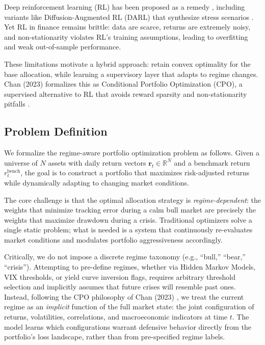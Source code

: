 \documentclass[conferences]{IEEEtran}
\begin{document}
Deep reinforcement learning (RL) has been proposed as a remedy \cite{sood2023}, including variants like Diffusion-Augmented RL (DARL) that synthesize stress scenarios \cite{choudhary2025}. Yet RL in finance remains brittle: data are scarce, returns are extremely noisy, and non-stationarity violates RL's training assumptions, leading to overfitting and weak out-of-sample performance.

These limitations motivate a hybrid approach: retain convex optimality for the base allocation, while learning a supervisory layer that adapts to regime changes. Chan (2023) formalizes this as Conditional Portfolio Optimization (CPO), a supervised alternative to RL that avoids reward sparsity and non-stationarity pitfalls \cite{chan2023}.

\subsection{Problem Definition}

We formalize the regime-aware portfolio optimization problem as follows. Given a universe of $N$ assets with daily return vectors $\mathbf{r}_t \in \mathbb{R}^N$ and a benchmark return $r_t^{\text{bench}}$, the goal is to construct a portfolio that maximizes risk-adjusted returns while dynamically adapting to changing market conditions.

The core challenge is that the optimal allocation strategy is \emph{regime-dependent}: the weights that minimize tracking error during a calm bull market are precisely the weights that maximize drawdown during a crisis. Traditional optimizers solve a single static problem; what is needed is a system that continuously re-evaluates market conditions and modulates portfolio aggressiveness accordingly.

Critically, we do not impose a discrete regime taxonomy (e.g., ``bull,'' ``bear,'' ``crisis''). Attempting to pre-define regimes, whether via Hidden Markov Models, VIX thresholds, or yield curve inversion flags, requires arbitrary threshold selection and implicitly assumes that future crises will resemble past ones. Instead, following the CPO philosophy of Chan (2023) \cite{chan2023}, we treat the current regime as an \emph{implicit} function of the full market state: the joint configuration of returns, volatilities, correlations, and macroeconomic indicators at time $t$. The model learns which configurations warrant defensive behavior directly from the portfolio's loss landscape, rather than from pre-specified regime labels.
\end{document}
